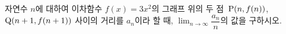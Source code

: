 자연수 $n$에 대하여 이차함수 $f(x)=3x^2$의 그래프 위의 두 점~$\mathrm{P}(n{,}\mkern3mu\mathopen{}f(n))$, $\mathrm{Q}(n+1{,}\mkern3mu\mathopen{}f(n+1))$ 사이의 거리를 $a_n$이라 할 때, $\displaystyle\lim_{n\to\infty}\dfrac{a_n}{n}$의 값을 구하시오.
